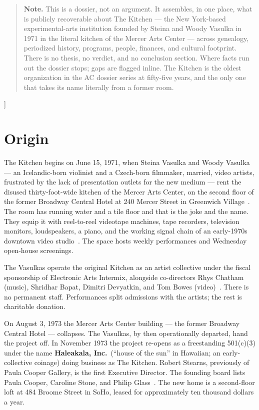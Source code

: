 \documentclass[10pt,letterpaper,twocolumn]{article}
\begin{document}
{\begin{quote}
\small\noindent\textbf{Note.} This is a dossier, not an argument. It assembles, in one place, what is publicly recoverable about The Kitchen --- the New York-based experimental-arts institution founded by Steina and Woody Vasulka in 1971 in the literal kitchen of the Mercer Arts Center --- across genealogy, periodized history, programs, people, finances, and cultural footprint. There is no thesis, no verdict, and no conclusion section. Where facts run out the dossier stops; gaps are flagged inline. The Kitchen is the oldest organization in the AC dossier series at fifty-five years, and the only one that takes its name literally from a former room.
\end{quote}
\vspace{0.5em}
}]

\section{Origin}

The Kitchen begins on June 15, 1971, when Steina Vasulka and Woody Vasulka --- an Icelandic-born violinist and a Czech-born filmmaker, married, video artists, frustrated by the lack of presentation outlets for the new medium --- rent the disused thirty-foot-wide kitchen of the Mercer Arts Center, on the second floor of the former Broadway Central Hotel at 240 Mercer Street in Greenwich Village~\citep{thekitchen_about,wikipedia_kitchen}. The room has running water and a tile floor and that is the joke and the name. They equip it with reel-to-reel videotape machines, tape recorders, television monitors, loudspeakers, a piano, and the working signal chain of an early-1970s downtown video studio~\citep{thekitchen_fieldnotes}. The space hosts weekly performances and Wednesday open-house screenings.

The Vasulkas operate the original Kitchen as an artist collective under the fiscal sponsorship of Electronic Arts Intermix, alongside co-directors Rhys Chatham (music), Shridhar Bapat, Dimitri Devyatkin, and Tom Bowes (video)~\citep{thekitchen_about,thekitchen_fieldnotes}. There is no permanent staff. Performances split admissions with the artists; the rest is charitable donation.

On August 3, 1973 the Mercer Arts Center building --- the former Broadway Central Hotel --- collapses. The Vasulkas, by then operationally departed, hand the project off. In November 1973 the project re-opens as a freestanding 501(c)(3) under the name \textbf{Haleakala, Inc.}~(``house of the sun'' in Hawaiian; an early-collective coinage) doing business as The Kitchen. Robert Stearns, previously of Paula Cooper Gallery, is the first Executive Director. The founding board lists Paula Cooper, Caroline Stone, and Philip Glass~\citep{thekitchen_fieldnotes}. The new home is a second-floor loft at 484 Broome Street in SoHo, leased for approximately ten thousand dollars a year.
\end{document}
